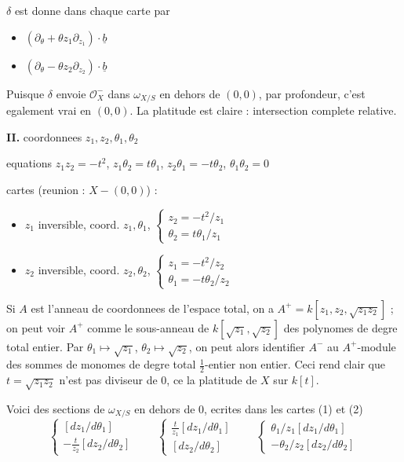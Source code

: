 \documentclass[11pt,a4paper]{article}
\theoremstyle{plain}
\theoremstyle{definition}
\begin{document}
$\delta$ est donne dans chaque carte par
\begin{itemize}
\item[(1)] $(\partial_\theta + \theta z_1\partial_{z_1}) \cdot \underline{b}$
\item[(2)] $(\partial_\theta - \theta z_2\partial_{z_2}) \cdot \underline{b}$
\end{itemize}

Puisque $\delta$ envoie $\mathcal{O}_X^-$ dans $\omega_{X/S}$ en dehors de $(0,0)$, par profondeur, c'est egalement vrai en $(0,0)$. La platitude est claire : intersection complete relative.

\medskip

\noindent \textbf{II.} coordonnees $z_1, z_2, \theta_1, \theta_2$

equations $z_1 z_2 = -t^2$, $z_1\theta_2 = t\theta_1$, $z_2\theta_1 = -t\theta_2$, $\theta_1\theta_2 = 0$

cartes (reunion : $X - (0,0)$) :
\begin{itemize}
\item[(1)] $z_1$ inversible, coord. $z_1, \theta_1$, $\begin{cases} z_2 = -t^2/z_1 \\ \theta_2 = t\theta_1/z_1 \end{cases}$
\item[(2)] $z_2$ inversible, coord. $z_2, \theta_2$, $\begin{cases} z_1 = -t^2/z_2 \\ \theta_1 = -t\theta_2/z_2 \end{cases}$
\end{itemize}

\newpage

Si $A$ est l'anneau de coordonnees de l'espace total, on a $A^+ = k[z_1, z_2, \sqrt{z_1 z_2}]$ ; on peut voir $A^+$ comme le sous-anneau de $k[\sqrt{z_1}, \sqrt{z_2}]$ des polynomes de degre total entier. Par $\theta_1 \mapsto \sqrt{z_1}$, $\theta_2 \mapsto \sqrt{z_2}$, on peut alors identifier $A^-$ au $A^+$-module des sommes de monomes de degre total $\frac{1}{2}$-entier non entier. Ceci rend clair que $t = \sqrt{z_1 z_2}$ n'est pas diviseur de 0, ce la platitude de $X$ sur $k[t]$.

Voici des sections de $\omega_{X/S}$ en dehors de 0, ecrites dans les cartes (1) et (2)
\[
\begin{cases} [dz_1/d\theta_1] \\ -\frac{t}{z_2}[dz_2/d\theta_2] \end{cases} \qquad
\begin{cases} \frac{t}{z_1}[dz_1/d\theta_1] \\ [dz_2/d\theta_2] \end{cases} \qquad
\begin{cases} \theta_1/z_1 [dz_1/d\theta_1] \\ -\theta_2/z_2 [dz_2/d\theta_2] \end{cases}
\]
\end{document}
